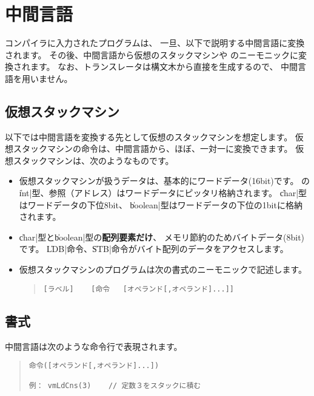 % 
%
\chapter{中間言語}
\label{app:vm}

\cmm コンパイラに入力された\cmm プログラムは、
一旦、以下で説明する中間言語に変換されます。
その後、中間言語から仮想のスタックマシンや
\tac のニーモニックに変換されます。
なお、{\cl}トランスレータは構文木から直接{\cl}を生成するので、
中間言語を用いません。

\section{仮想スタックマシン}

以下では中間言語を変換する先として仮想のスタックマシンを想定します。
仮想スタックマシンの命令は、中間言語から、ほぼ、一対一に変換できます。
仮想スタックマシンは、次のようなものです。

\begin{itemize}
\item 
仮想スタックマシンが扱うデータは、基本的にワードデータ(16bit)です。
{\cmml}の\|int|型、参照（アドレス）はワードデータにピッタリ格納されます。
\|char|型はワードデータの下位8bit、
\|boolean|型はワードデータの下位の1bitに格納されます。

\item
\|char|型と\|boolean|型の{\bf 配列要素だけ}、
メモリ節約のためバイトデータ(8bit)です。
\|LDB|命令、\|STB|命令がバイト配列のデータをアクセスします。

\item
仮想スタックマシンのプログラムは次の書式のニーモニックで記述します。

\begin{quote}
\begin{verbatim}
[ラベル]    [命令   [オペランド[,オペランド]...]]
\end{verbatim}
\end{quote}

\end{itemize}

\section{書式}

中間言語は次のような命令行で表現されます。

\begin{quote}
\begin{verbatim}
命令([オペランド[,オペランド]...])

例： vmLdCns(3)    // 定数３をスタックに積む
\end{verbatim}
\end{quote}

